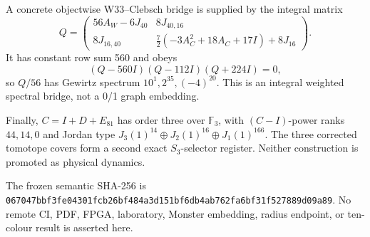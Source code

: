 A concrete objectwise W33--Clebsch bridge is supplied by the integral matrix
\[
Q=\begin{pmatrix}
56A_W-6J_{40}&8J_{40,16}\\
8J_{16,40}&\frac72(-3A_C^2+18A_C+17I)+8J_{16}
\end{pmatrix}.
\]
It has constant row sum 560 and obeys
\[
(Q-560I)(Q-112I)(Q+224I)=0,
\]
so \(Q/56\) has Gewirtz spectrum \(10^1,2^{35},(-4)^{20}\). This is an integral weighted spectral bridge, not a 0/1 graph embedding.

Finally, \(C=I+D+E_{81}\) has order three over \(\mathbb F_3\), with \((C-I)\)-power ranks \(44,14,0\) and Jordan type \(J_3(1)^{14}\oplus J_2(1)^{16}\oplus J_1(1)^{166}\). The three corrected tomotope covers form a second exact \(S_3\)-selector register. Neither construction is promoted as physical dynamics.

The frozen semantic SHA-256 is \texttt{067047bbf3fe04301fcb26bf484a3d151bf6db4ab762fa6bf31f527889d09a89}. No remote CI, PDF, FPGA, laboratory, Monster embedding, radius endpoint, or ten-colour result is asserted here.
